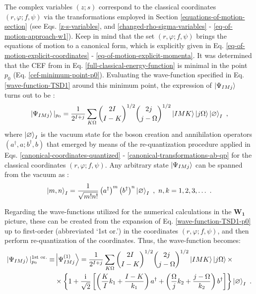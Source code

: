 The complex variables $(z;s)$ correspond to the classical coordinates $(r,\varphi;f,\psi)$ via the transformations employed in Section \ref{equations-of-motion-section} (see Eqs. \ref{z-s-variables}, and \ref{changed-rho-sigma-variables} - \ref{eq-of-motion-approach-w1}). Keep in mind that the set $(r,\varphi;f,\psi)$ brings the equations of motion to a canonical form, which is explicitly given in Eq. \ref{eq-of-motion-explicit-coordinates} - \ref{eq-of-motion-explicit-momenta}. It was determined that the CEF from in Eq. \ref{full-classical-energy-function} is minimal in the point $p_0$ (Eq. \ref{cef-minimum-point-p0}). Evaluating the wave-function specified in Eq. \ref{wave-function-TSD1} around this minimum point, the expression of $\ket{\Psi_{IMj}}$ turns out to be \cite{raduta2020approach,raduta2020towards}:
\begin{align}
    \ket{\Psi_{IMj}}|_{p_0}=\frac{1}{2^{I+j}}\sum_{K\Omega}\binom{2I}{I-K}^{1/2}\binom{2j}{j-\Omega}^{1/2}\ket{IMK}\ket{j\Omega}\ket{\varnothing}_I\ ,
    \label{wave-function-TSD1-p0}
\end{align}
where $\ket{\varnothing}_I$ is the vacuum state for the boson creation and annihilation operators $(a^\dagger,a;b^\dagger,b)$ that emerged by means of the re-quantization procedure applied in Eqs. \ref{canonical-coordinates-quantized} - \ref{canonical-transformations-ab-qp} for the classical coordinates $(r,\varphi;f,\psi)$. Any arbitrary state $\ket{\Psi_{IMj}}$ can be spanned from the vacuum as \cite{raduta2017semiclassical}:
\begin{align}
    \ket{m,n}_I=\frac{1}{\sqrt{m!n!}}\left(a^\dagger\right)^m\left(b^\dagger\right)^n\ket{\varnothing}_I\ ,\ n,k=1,2,3,\dots\ .
\end{align}

Regarding the wave-functions utilized for the numerical calculations in the $\mathbf{W_1}$ picture, these can be created from the expansion of Eq. \ref{wave-function-TSD1-p0} up to first-order (abbreviated `1st or.') in the coordinates $(r,\varphi;f,\psi)$, and then perform re-quantization of the coordinates. Thus, the wave-function becomes:
\begin{align}
    \ket{\Psi_{IMj}}|_{p_0}^{\text{1st or.}}\equiv&\ket{\Psi_{IMj}^{(1)}}=\frac{1}{2^{I+j}}\sum_{K\Omega}\binom{2I}{I-K}^{1/2}\binom{2j}{j-\Omega}^{1/2}\ket{IMK}\ket{j\Omega}\times\nonumber\\
                           &\times\left\{1+\frac{\iu}{\sqrt{2}}\left[\left(\frac{K}{I}k_1+\frac{I-K}{k_1}\right)a^\dagger+\left(\frac{\Omega}{j}k_2+\frac{j-\Omega}{k_2}\right)b^\dagger\right]\right\}\ket{\varnothing}_I\ .
    \label{wave-function-TSD1-p0-first-order}
\end{align}

